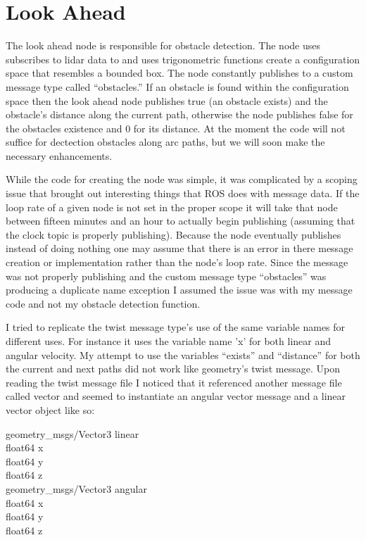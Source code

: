 \section{Look Ahead}

The look ahead node is responsible for obstacle detection. The node uses subscribes to lidar data to and uses trigonometric functions create a configuration space that resembles a bounded box. The node constantly publishes to a custom message type called ``obstacles.'' If an obstacle is found within the configuration space then the look ahead node publishes true (an obstacle exists) and the obstacle's distance along the current path, otherwise the node publishes false for the obstacles existence and 0 for its distance. At the moment the code will not suffice for dectection obstacles along arc paths, but we will soon make the necessary enhancements.

While the code for creating the node was simple, it was complicated by a scoping issue that brought out interesting things that ROS does with message data. If the loop rate of a given node is not set in the proper scope it will take that node between fifteen minutes and an hour to actually begin publishing (assuming that the clock topic is properly publishing). Because the node eventually publishes instead of doing nothing one may assume that there is an error in there message creation or implementation rather than the node's loop rate. Since the message was not properly publishing and the custom message type ``obstacles'' was producing a duplicate  name exception I assumed the issue was with my message code and not my obstacle detection function.

I tried to replicate the twist message type's use of the same variable names for different uses. For instance it uses the variable name 'x' for both linear and angular velocity. My attempt to use the variables ``exists'' and ``distance'' for both the current and next paths did not work like geometry's twist message. Upon reading the twist message file I noticed that it referenced another message file called vector and seemed to instantiate an angular vector message and a linear vector object like so:

geometry\_msgs/Vector3 linear\\
  float64 x\\
  float64 y\\
  float64 z\\
geometry\_msgs/Vector3 angular\\
  float64 x\\
  float64 y\\
  float64 z\\

